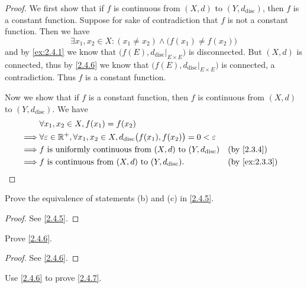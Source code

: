 \begin{proof}
  We first show that if \(f\) is continuous from \((X, d)\) to \((Y, d_{\text{disc}})\), then \(f\) is a constant function.
  Suppose for sake of contradiction that \(f\) is not a constant function.
  Then we have
  \[
    \exists x_1, x_2 \in X : (x_1 \neq x_2) \land \big(f(x_1) \neq f(x_2)\big)
  \]
  and by \cref{ex:2.4.1} we know that \(\big(f(E), d_{\text{disc}}|_{E \times E}\big)\) is disconnected.
  But \((X, d)\) is connected, thus by \cref{2.4.6} we know that \(\big(f(E), d_{\text{disc}}|_{E \times E}\big)\) is connected, a contradiction.
  Thus \(f\) is a constant function.

  Now we show that if \(f\) is a constant function, then \(f\) is continuous from \((X, d)\) to \((Y, d_{\text{disc}})\).
  We have
  \begin{align*}
             & \forall x_1, x_2 \in X, f(x_1) = f(x_2)                                                                                            \\
    \implies & \forall \varepsilon \in \R^+, \forall x_1, x_2 \in X, d_{\text{disc}}\big(f(x_1), f(x_2)\big) = 0 < \varepsilon                    \\
    \implies & f \text{ is uniformly continuous from } (X, d) \text{ to } (Y, d_{\text{disc}})                                 &  & \by{2.3.4}    \\
    \implies & f \text{ is continuous from } (X, d) \text{ to } (Y, d_{\text{disc}}).                                          &  & \by{ex:2.3.3}
  \end{align*}
\end{proof}

\begin{ex}\label{ex:2.4.3}
  Prove the equivalence of statements (b) and (c) in \cref{2.4.5}.
\end{ex}

\begin{proof}
  See \cref{2.4.5}.
\end{proof}

\begin{ex}\label{ex:2.4.4}
  Prove \cref{2.4.6}.
\end{ex}

\begin{proof}
  See \cref{2.4.6}.
\end{proof}

\begin{ex}\label{ex:2.4.5}
  Use \cref{2.4.6} to prove \cref{2.4.7}.
\end{ex}

